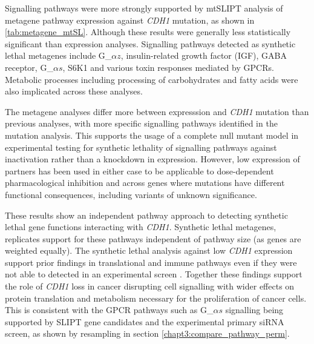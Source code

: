 Signalling pathways were more strongly supported by mtSLIPT analysis of metagene pathway expression against \textit{CDH1} mutation, as shown in \ref{tab:metagene_mtSL}. Although these results were generally less statistically significant than expression analyses. Signalling pathways detected as synthetic lethal metagenes include G_${\alpha z}$, insulin-related growth factor (IGF), GABA receptor, G_${\alpha s}$, S6K1 and various toxin responses mediated by GPCRs. Metabolic processes including processing of carbohydrates and fatty acids were also implicated across these analyses.

The metagene analyses differ more between expresssion and \textit{CDH1} mutation than previous analyses, with more specific signalling pathways identified in the mutation analysis. This supports the usage of a complete null mutant model in experimental testing for synthetic lethality of signalling pathways against  inactivation rather than a knockdown in expression. However, low expression of partners has been used in either case to be applicable to dose-dependent pharmacological inhibition and across genes where mutations have different functional consequences, including variants of unknown significance. 

These results show an independent pathway approach to detecting synthetic lethal gene functions interacting with \textit{CDH1}. Synthetic lethal metagenes, replicates support for these pathways independent of pathway size (as genes are weighted equally). The synthetic lethal analysis against low \textit{CDH1} expression support prior findings in translational and immune pathways even if they were not able to detected in an experimental screen \citep{Telford2015}. Together these findings support the role of \textit{CDH1} loss in cancer disrupting cell signalling with wider effects on protein translation and metabolism necessary for the proliferation of cancer cells. This is consistent with the GPCR pathways such as G_${\alpha s}$ signalling being supported by SLIPT gene candidates and the experimental primary siRNA screen, as shown by resampling in section \ref{chapt3:compare_pathway_perm}.


\FloatBarrier


